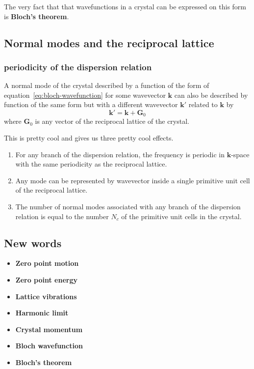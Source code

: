 \documentclass[11pt]{article}
\begin{document}
The very fact that that wavefunctions in a crystal can be expressed on this form is \textbf{Bloch's theorem}.
	
\subsection{Normal modes and the reciprocal lattice}
\subsubsection{periodicity of the dispersion relation}
A normal mode of the crystal described by a function of the form of equation~\ref{eq:bloch-wavefunction} for some wavevector $\pmb{k}$ can also be described by function of the same form but with a different wavevector $\pmb{k}'$ related to $\pmb{k}$ by
\begin{equation}
	\pmb{k}' = \pmb{k} + \pmb{G}_0
\end{equation}
where $\pmb{G}_0$ is any vector of the reciprocal lattice of the crystal.

This is pretty cool and gives us three pretty cool effects.
\begin{enumerate}
	\item For any branch of the dispersion relation, the frequency is periodic in $\pmb{k}$-space with the same periodicity as the reciprocal lattice.
	\item Any mode can be represented by wavevector inside a single primitive unit cell of the reciprocal lattice.
	\item The number of normal modes associated with any branch of the dispersion relation is equal to the number $N_c$ of the primitive unit cells in the crystal.
\end{enumerate}
\newpage
\subsection{New words}
\begin{itemize}
	\item \textbf{Zero point motion}
	\item \textbf{Zero point energy}
	\item \textbf{Lattice vibrations}
	\item \textbf{Harmonic limit}
	\item \textbf{Crystal momentum}
	\item \textbf{Bloch wavefunction}
	\item \textbf{Bloch's theorem}
\end{itemize}
\newpage
\end{document}

